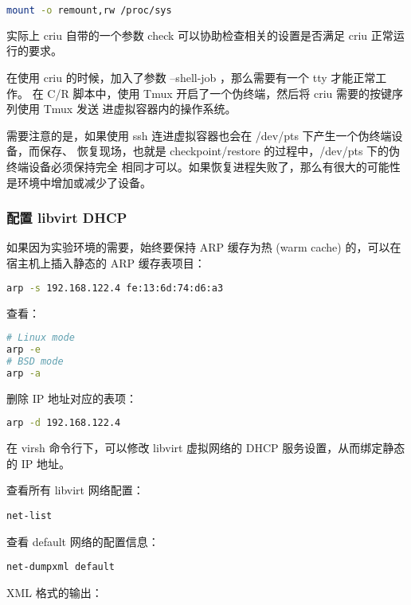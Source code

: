 \begin{lstlisting}[language=bash]
mount -o remount,rw /proc/sys
\end{lstlisting}

实际上 criu 自带的一个参数 check 可以协助检查相关的设置是否满足 criu 正常运行的要求。

在使用 criu 的时候，加入了参数 --shell-job ，那么需要有一个 tty 才能正常工作。
在 C/R 脚本中，使用 Tmux 开启了一个伪终端，然后将 criu 需要的按键序列使用 Tmux 发送
进虚拟容器内的操作系统。

需要注意的是，如果使用 ssh 连进虚拟容器也会在 /dev/pts 下产生一个伪终端设备，而保存、
恢复现场，也就是 checkpoint/restore 的过程中，/dev/pts 下的伪终端设备必须保持完全
相同才可以。如果恢复进程失败了，那么有很大的可能性是环境中增加或减少了设备。

\subsubsection{配置 libvirt DHCP}

如果因为实验环境的需要，始终要保持 ARP 缓存为热 (warm cache) 的，可以在宿主机上插入静态的
ARP 缓存表项目：

\begin{lstlisting}[language=bash]
arp -s 192.168.122.4 fe:13:6d:74:d6:a3
\end{lstlisting}

查看：

\begin{lstlisting}[language=bash]
# Linux mode
arp -e
# BSD mode
arp -a
\end{lstlisting}

删除 IP 地址对应的表项：

\begin{lstlisting}[language=bash]
arp -d 192.168.122.4
\end{lstlisting}

在 virsh 命令行下，可以修改 libvirt 虚拟网络的 DHCP 服务设置，从而绑定静态的 IP 地址。

查看所有 libvirt 网络配置：

\begin{lstlisting}
net-list
\end{lstlisting}

查看 default 网络的配置信息：

\begin{lstlisting}
net-dumpxml default
\end{lstlisting}

XML 格式的输出：

